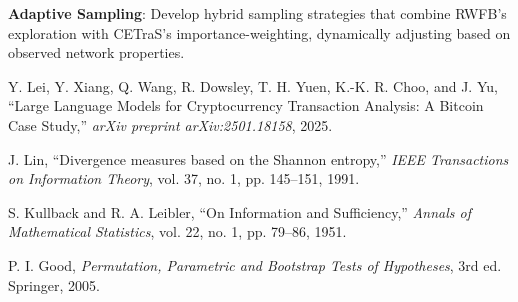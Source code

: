 \textbf{Adaptive Sampling}: Develop hybrid sampling strategies that combine RWFB's exploration with CETraS's importance-weighting, dynamically adjusting based on observed network properties.


\begin{thebibliography}{99}

Y. Lei, Y. Xiang, Q. Wang, R. Dowsley, T. H. Yuen, K.-K. R. Choo, and J. Yu,
``Large Language Models for Cryptocurrency Transaction Analysis: A Bitcoin Case Study,''
\textit{arXiv preprint arXiv:2501.18158}, 2025.

J. Lin,
``Divergence measures based on the Shannon entropy,''
\textit{IEEE Transactions on Information Theory}, vol. 37, no. 1, pp. 145--151, 1991.

S. Kullback and R. A. Leibler,
``On Information and Sufficiency,''
\textit{Annals of Mathematical Statistics}, vol. 22, no. 1, pp. 79--86, 1951.

P. I. Good,
\textit{Permutation, Parametric and Bootstrap Tests of Hypotheses}, 3rd ed.
Springer, 2005.

\end{thebibliography}
